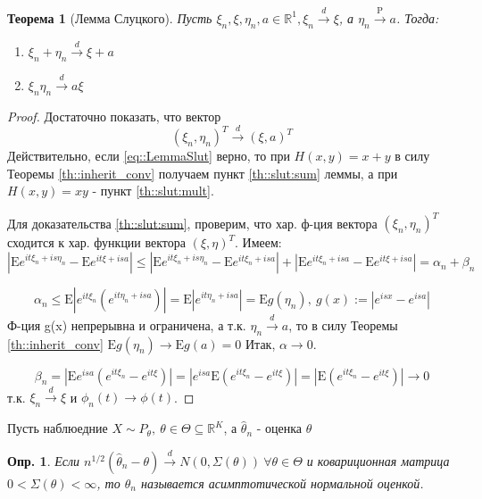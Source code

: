 \documentclass[12pt]{article}
\newtheorem{definition}{Опр.}
\theoremstyle{basic_theorem}
\theoremstyle{name_theorem}
\newtheorem*{named_theorem}{Теорема}
\def\R{
    \mathbb{R}
}
\def\E{
    \mathrm{E}
}
\def\P{
    \mathrm{P}
}
\begin{document}
\begin{named_theorem}[Лемма Слуцкого]
\label{th::slut}
    Пусть $\xi_n, \xi, \eta_n, a \in \R^1, \xi_n \xrightarrow{d} \xi$, а $\eta_n \xrightarrow{\P} a$.
    Тогда:
    \begin{enumerate}
        \item \label{th::slut:sum} $\xi_n + \eta_n \xrightarrow{d} \xi + a$
        \item \label{th::slut:mult} $\xi_n \eta_n \xrightarrow{d} a\xi$
    \end{enumerate}
\end{named_theorem}
\begin{proof}
    Достаточно показать, что вектор
    \begin{equation} \label{eq::LemmaSlut}
        (\xi_n, \eta_n)^T \xrightarrow{d} (\xi, a)^T 
    \end{equation}
    Действительно, если \eqref{eq::LemmaSlut} верно, то при $H(x, y) = x + y$ в силу Теоремы \ref{th::inherit_conv} получаем пункт \ref{th::slut:sum} леммы,
    а при $H(x, y) = xy$ -  пункт \ref{th::slut:mult}.

    Для доказательства \ref{th::slut:sum}, проверим, что хар. ф-ция
    вектора $(\xi_n, \eta_n)^T$ сходится к хар. функции вектора $(\xi, \eta)^T$.
    Имеем: 
    $$|\E e^{it\xi_n + is\eta_n} - \E e^{it\xi + isa}| \leq | \E e^{it\xi_n + is\eta_n} - \E e^{it\xi_n + isa}| + | \E e^{it\xi_n + isa} - \E e^{it\xi + isa}| = \alpha_n + \beta_n$$

    $$\alpha_n \leq \E |e^{it\xi_n}(e^{it\eta_n + isa})| = \E |e^{it\eta_n + isa}| = \E g(\eta_n), \ g(x):= |e^{isx} - e^{isa}|$$
    Ф-ция g(x) непрерывна и ограничена, а т.к. $\eta_n \xrightarrow{d} a$,
    то в силу Теоремы \ref{th::inherit_conv} $\E g(\eta_n) \rightarrow \E g(a) = 0$
    Итак, $\alpha \rightarrow 0$.

    $$\beta_n = |\E e^{isa}(e^{it\xi_n} - e^{it\xi})| = |e^{isa} \E (e^{it\xi_n} - e^{it\xi})| = |\E (e^{it\xi_n} - e^{it\xi})| \rightarrow 0$$
    т.к. $\xi_n \xrightarrow{d} \xi$ и $\phi_n(t) \rightarrow \phi(t)$.
\end{proof}

Пусть наблюедние $X \sim  P_{\theta},\ \theta \in \Theta \subseteq \R^{K}$, а $\hat{\theta}_n$ - оценка $\theta$

\begin{definition}
    Если $n^{1/2}(\hat{\theta}_n - \theta) \xrightarrow{d} N(0, \Sigma(\theta)) \ \forall \theta \in \Theta$
    и ковариционная матрица $0 < \Sigma(\theta) < \infty$, то $\hat{\theta}_n$ называется асимптотической нормальной оценкой.
\end{definition}
\end{document}
